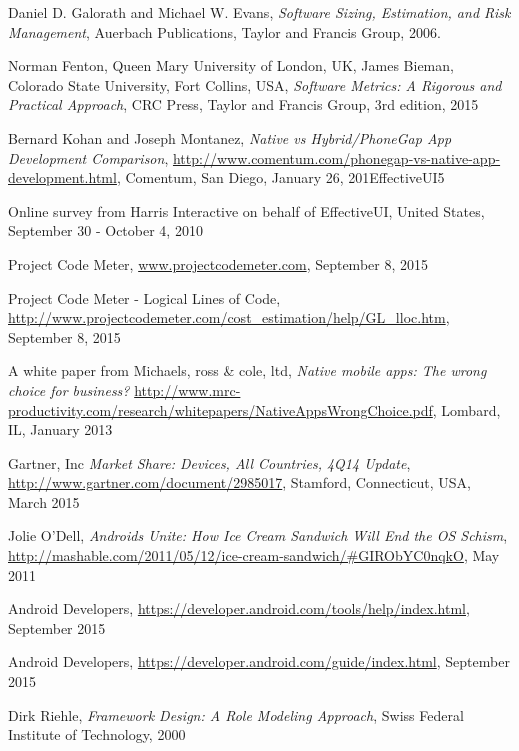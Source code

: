 \begin{thebibliography}{9}

Daniel D. Galorath and Michael W. Evans, \emph{Software Sizing, Estimation, and Risk Management}, Auerbach Publications, Taylor and Francis Group, 2006.
  
Norman Fenton, Queen Mary University of London, UK, James Bieman, Colorado State University, Fort Collins, USA, \emph{Software Metrics: A Rigorous and Practical Approach}, CRC Press, Taylor and Francis Group, 3rd edition, 2015
  
Bernard Kohan and Joseph Montanez,
\emph{Native vs Hybrid/PhoneGap App Development Comparison},
  \url{http://www.comentum.com/phonegap-vs-native-app-development.html},
  Comentum, San Diego,
  January 26, 201EffectiveUI5
  
	Online survey from Harris Interactive on behalf of EffectiveUI,
	United States,
September 30 - October 4, 2010

	Project Code Meter,
	\url{www.projectcodemeter.com},
September 8, 2015

	Project Code Meter - Logical Lines of Code,
	\url{http://www.projectcodemeter.com/cost_estimation/help/GL_lloc.htm},
September 8, 2015

	A white paper from Michaels, ross \& cole, ltd,
	\emph{Native mobile apps: The wrong choice for business?}
	\url{http://www.mrc-productivity.com/research/whitepapers/NativeAppsWrongChoice.pdf},
	Lombard, IL,
January 2013

	Gartner, Inc
	\emph{Market Share: Devices, All Countries, 4Q14 Update},
	\url{ http://www.gartner.com/document/2985017},
	Stamford, Connecticut, USA,
March 2015

	Jolie O'Dell, 
	\emph{Androids Unite: How Ice Cream Sandwich Will End the OS Schism},
	\url{ http://mashable.com/2011/05/12/ice-cream-sandwich/#GIRObYC0nqkO},
	May 2011
	
	Android Developers, 
	\url{https://developer.android.com/tools/help/index.html},
	September 2015

	Android Developers, 
	\url{https://developer.android.com/guide/index.html},
	September 2015

	Dirk Riehle, 
	\emph{Framework Design: A Role Modeling Approach},
	Swiss Federal Institute of Technology,
	2000
	

\end{thebibliography}
